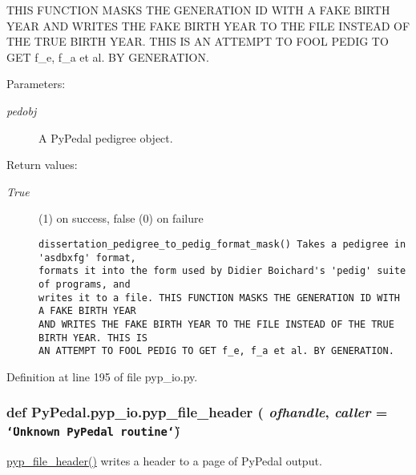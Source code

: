 THIS FUNCTION MASKS THE GENERATION ID WITH A FAKE BIRTH YEAR AND WRITES THE FAKE BIRTH YEAR TO THE FILE INSTEAD OF THE TRUE BIRTH YEAR. THIS IS AN ATTEMPT TO FOOL PEDIG TO GET f\_\-e, f\_\-a et al. BY GENERATION. \begin{Desc}
\item[Parameters:]
\begin{description}
\item[{\em pedobj}]A Py\-Pedal pedigree object. \end{description}
\end{Desc}
\begin{Desc}
\item[Return values:]
\begin{description}
\item[{\em True}](1) on success, false (0) on failure

\footnotesize\begin{verbatim}dissertation_pedigree_to_pedig_format_mask() Takes a pedigree in 'asdbxfg' format,
formats it into the form used by Didier Boichard's 'pedig' suite of programs, and
writes it to a file. THIS FUNCTION MASKS THE GENERATION ID WITH A FAKE BIRTH YEAR
AND WRITES THE FAKE BIRTH YEAR TO THE FILE INSTEAD OF THE TRUE BIRTH YEAR. THIS IS
AN ATTEMPT TO FOOL PEDIG TO GET f_e, f_a et al. BY GENERATION.
\end{verbatim}
\normalsize
 \end{description}
\end{Desc}


Definition at line 195 of file pyp\_\-io.py.\hypertarget{namespacePyPedal_1_1pyp__io_3e7555b76911d21bcbc6c0e64c653f42}{
\subsubsection[pyp\_\-file\_\-header]{\setlength{\rightskip}{0pt plus 5cm}def Py\-Pedal.pyp\_\-io.pyp\_\-file\_\-header ( {\em ofhandle},  {\em caller} = {\tt \char`\"{}Unknown~PyPedal~routine\char`\"{}})}}
\label{namespacePyPedal_1_1pyp__io_3e7555b76911d21bcbc6c0e64c653f42}


\hyperlink{namespacePyPedal_1_1pyp__io_3e7555b76911d21bcbc6c0e64c653f42}{pyp\_\-file\_\-header()} writes a header to a page of Py\-Pedal output. 

